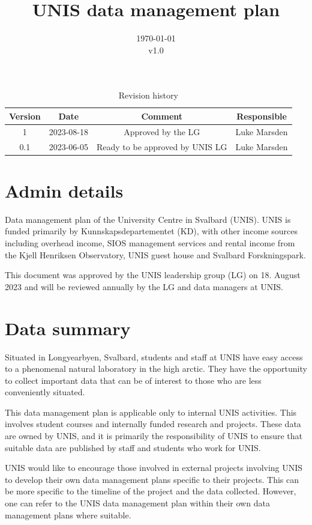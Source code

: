 \documentclass[a4paper,english, 11pt]{article}
\title{UNIS data management plan}
\date{\today\\v1.0}
\begin{document}
\maketitle
\begin{table}[b]
\centering
\caption{Revision history}
\begin{tabular}{cccc}
\toprule
Version & Date       & Comment                                      & Responsible \\
\midrule
1       & 2023-08-18 & Approved by the LG & Luke Marsden     \\
0.1     & 2023-06-05 & Ready to be approved by UNIS LG & Luke Marsden     \\
\bottomrule
\end{tabular}
\end{table}
\newpage
\tableofcontents
\newpage

\section{Admin details}
\label{s:admin}

Data management plan of the University Centre in Svalbard (UNIS). UNIS is funded primarily by Kunnskapsdepartementet (KD), with other income sources including overhead income, SIOS management services and rental income from the Kjell Henriksen Observatory, UNIS guest house and Svalbard Forskningspark.

This document was approved by the UNIS leadership group (LG) on 18. August 2023 and will be reviewed annually by the LG and data managers at UNIS. 

\section{Data summary}
\label{s:data}

Situated in Longyearbyen, Svalbard, students and staff at UNIS have easy access to a phenomenal natural laboratory in the high arctic. 
They have the opportunity to collect important data that can be of interest to those who are less conveniently situated.

This data management plan is applicable only to internal UNIS activities. This involves student courses and internally funded research and projects. These data are owned by UNIS, and it is primarily the responsibility of UNIS to ensure that suitable data are published by staff and students who work for UNIS. 

UNIS would like to encourage those involved in external projects involving UNIS to develop their own data management plans specific to their projects. This can be more specific to the timeline of the project and the data collected. However, one can refer to the UNIS data management plan within their own data management plans where suitable.
\end{document}
